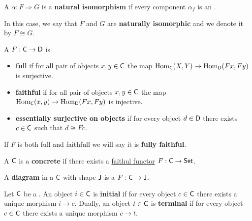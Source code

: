 \documentclass[../main.tex]{subfiles}
\begin{document}
\begin{definition} \label{def:natural-isomorphism}
  A  \(\alpha: F \Rightarrow G\) is a \textbf{natural isomorphism} if every component \(\alpha_{f}\) is an .

  In this case, we say that \(F\) and \(G\) are \textbf{naturally isomorphic} and we denote it by \(F \cong G\).
\end{definition}


\begin{definition} \label{def:functor-types}
  A  \(F: \mathsf{C} \to \mathsf{D}\) is
  \begin{itemize}
    \item \textbf{full} if for all pair of objects \(x, y \in \mathsf{C}\) the map \(\operatorname{Hom}_{\mathsf{C}}(X, Y) \to \operatorname{Hom}_{\mathsf{D}}(Fx, Fy)\) is surjective.
    \item \textbf{faithful} if for all pair of objects \(x, y \in \mathsf{C}\) the map \(\operatorname{Hom}_{\mathsf{C}}(x, y) \to \operatorname{Hom}_{\mathsf{D}}(Fx, Fy)\) is injective.
    \item \textbf{essentially surjective on objects} if for every object \(d \in \mathsf{D}\) there exists \(c \in \mathsf{C}\) such that \(d \cong Fc\).
  \end{itemize}

  If \(F\) is both full and faithfull we will say it is \textbf{fully faithful}.
\end{definition}

\begin{definition} \label{def:concrete-category}
  A  \(\mathsf{C}\) is a \textbf{concrete } if there exists a \hyperref[def:functor-types]{faithul functor} \(F: \mathsf{C} \to \mathsf{Set}\).
\end{definition}


\begin{definition}[Diagram] \label{def:diagram}
  A \textbf{diagram} in a  \(\mathsf{C}\) with shape \(\mathsf{J}\) is a  \(F: \mathsf{C} \to \mathsf{J}\).
\end{definition}

\begin{definition} \label{def:initial-terminal-objects}
  Let \(\mathsf{C}\) be a .
  An object \(i \in \mathsf{C}\) is \textbf{initial} if for every object \(c \in \mathsf{C}\) there exists a unique morphism \(i \to c\).
  Dually, an object \(t \in \mathsf{C}\) is \textbf{terminal} if for every object \(c \in \mathsf{C}\) there exists a unique morphism \(c \to t\).
\end{definition}
\end{document}
